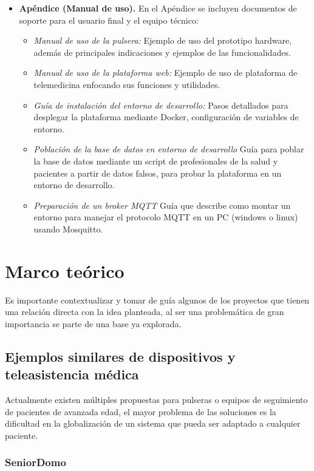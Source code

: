 \documentclass[12pt, a4paper]{article}
\begin{document}
\begin{itemize}
		\item \textbf{Apéndice (Manual de uso).}  
		En el Apéndice se incluyen documentos de soporte para el usuario final y el equipo técnico:
		\begin{itemize}
			\item \emph{Manual de uso de la pulsera:} Ejemplo de uso del prototipo hardware, además de principales indicaciones y ejemplos de las funcionalidades.  
			\item \emph{Manual de uso de la plataforma web:} Ejemplo de uso de plataforma de telemedicina enfocando sus funciones y utilidades. 
			\item \emph{Guía de instalación del entorno de desarrollo:} Pasos detallados para desplegar la plataforma mediante Docker, configuración de variables de entorno.
			\item \emph{Población de la base de datos en entorno de desarrollo} Guía para poblar la base de datos mediante un script de profesionales de la salud y pacientes a partir de datos falsos, para probar la plataforma en un entorno de desarrollo.
			\item \emph{Preparación de un broker MQTT} Guía que describe como montar un entorno para manejar el protocolo MQTT en un PC (windows o linux) usando Mosquitto.
		\end{itemize}
	\end{itemize}
	

\section{Marco teórico}

	Es importante contextualizar y tomar de guía algunos de los proyectos que tienen una relación directa con la idea planteada, al ser una problemática de gran importancia se parte de una base ya explorada.

	\subsection{Ejemplos similares de dispositivos y teleasistencia médica}
	
	Actualmente existen múltiples propuestas para pulseras o equipos de seguimiento de pacientes de avanzada edad, el mayor problema de las soluciones es la dificultad en la globalización de un sistema que pueda ser adaptado a cualquier paciente.
	
	\subsubsection{SeniorDomo}
	
\end{document}
